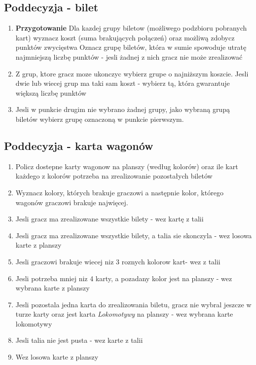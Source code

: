 \documentclass[12pt, oneside]{report}
\begin{document}
\subsection{Poddecyzja - bilet}
\begin{enumerate}
	\item \textbf{Przygotowanie} Dla kazdej grupy biletow (możliwego podzbioru pobranych kart) wyznacz koszt (suma brakujących połączeń) oraz możliwą zdobycz punktów zwycięstwa
	\subitem Oznacz grupę biletów, która w sumie spowoduje utratę najmniejszą liczbę punktów - jesli żadnej z nich gracz nie może zrealizować
	\item Z grup, ktore gracz moze ukonczyc wybierz grupe o najniższym koszcie. Jesli dwie lub wiecej grup ma taki sam koszt - wybierz tą, która gwarantuje większą liczbę punktów
	\item Jesli w punkcie drugim nie wybrano żadnej grupy, jako wybraną grupą biletów wybierz grupę oznaczoną w punkcie pierwszym.
\end{enumerate}
\subsection{Poddecyzja - karta wagonów}
\begin{enumerate}
	\item Policz dostepne karty wagonow na planszy (według kolorów) oraz ile kart każdego z kolorów potrzeba na zrealizowanie pozostałych biletów
	\item Wyznacz kolory, których brakuje graczowi a następnie kolor, którego wagonów graczowi brakuje najwięcej.
	\item Jesli gracz ma zrealizowane wszystkie bilety - wez kartę z talii 
	\item Jesli gracz ma zrealizowane wszystkie bilety, a talia sie skonczyla - wez losowa karte z planszy
	\item Jesli graczowi brakuje wiecej niz 3 roznych kolorow kart- wez z talii
	\item Jesli potrzeba mniej niz 4 karty, a pozadany kolor jest na planszy - wez wybrana karte z planszy
	\item Jesli pozostala jedna karta do zrealizowania biletu, gracz nie wybral jeszcze w turze karty oraz jest karta \textit{Lokomotywy} na planszy - wez wybrana karte lokomotywy
	\item Jesli talia nie jest pusta - wez karte z talii
	\item Wez losowa karte z planszy
\end{enumerate}
\end{document}
